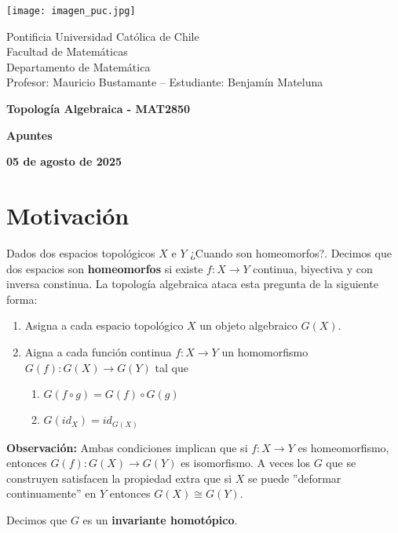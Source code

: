 \documentclass{article}
\begin{document}
\begin{minipage}{2.5cm}
    \texttt{[image: imagen\_puc.jpg]}
\end{minipage}
\begin{minipage}{14cm}
    {\sc Pontificia Universidad Católica de Chile\\
    Facultad de Matemáticas\\
    Departamento de Matemática\\
    Profesor: Mauricio Bustamante -- Estudiante: Benjamín Mateluna}
\end{minipage}
\vspace{1ex}

{\centerline{\bf Topología Algebraica - MAT2850}
\centerline{\bf Apuntes}}
\centerline{\bf 05 de agosto de 2025}

\newpage
\tableofcontents

\newpage
\section*{Motivación}
{}
\noindent Dados dos espacios topológicos $X$ e $Y$ ¿Cuando son homeomorfos?. Decimos que dos 
espacios son \textbf{homeomorfos} si existe $f:X\to Y$ continua, biyectiva y con inversa 
constinua. La topología algebraica ataca esta pregunta de la siguiente forma:
\begin{enumerate}
    \item Asigna a cada espacio topológico $X$ un objeto algebraico $G(X)$.
    \item Aigna a cada función continua $f:X\to Y$ un homomorfismo $G(f):G(X)\to G(Y)$ tal que
    \begin{enumerate}
        \item $G(f\circ g)=G(f)\circ G(g)$
        \item $G(id_{X})=id_{G(X)}$
    \end{enumerate}
\end{enumerate}
\noindent\textbf{Observación:} Ambas condiciones implican que si $f:X\to Y$ es homeomorfismo, 
entonces $G(f):G(X)\to G(Y)$ es isomorfismo. A veces los $G$ que se construyen satisfacen la 
propiedad extra que si $X$ se puede ''deformar continuamente'' en $Y$ entonces $G(X)\cong G(Y)$.

\vspace{2mm}
\noindent Decimos que $G$ es un \textbf{invariante homotópico}.
\end{document}
